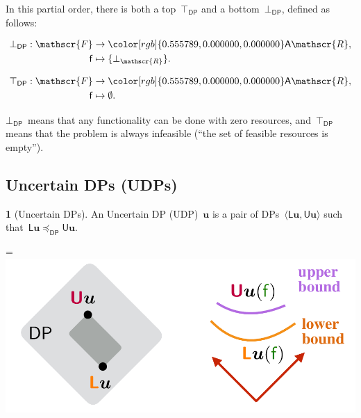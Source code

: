 \documentclass[twocolumn,english]{IEEEconf}
\theoremstyle{plain}
\theoremstyle{definition}
\theoremstyle{definition}
\newtheorem{defn}[thm]{\protect\definitionname}
\theoremstyle{plain}
\newcommand{\aword}[1]{\mathsf{#1}}
\newcommand{\vmath}[1]{\aword{#1}}
\newcommand{\posleq}{\preceq}
\newcommand{\antichains}{\vmath{A}}
\newcommand{\funsp}{\mathscr{F}}
\newcommand{\fun}{\vmath{f}}
\newcommand{\ressp}{\mathscr{R}}
\newcommand{\Aressp}{{\antichains\ressp}}
\newcommand{\udpL}{\boldsymbol{\mathsf{L}}}
\newcommand{\udpU}{\boldsymbol{\mathsf{U}}}
\newcommand{\dpsp}{\vmath{DP}}
\newcommand{\dpleq}{\posleq_\dpsp}
\newcommand{\colR}{\color[rgb]{0.555789,0.000000,0.000000}}
\newcommand*{\vcenteredhbox}[1]{\begingroup
\setbox0=\hbox{#1}\parbox{\wd0}{\box0}\endgroup}
\newcommand{\captionsideleft}[2]{
    \medskip
    \begin{minipage}{1.8cm}{
        \hfill
        \protect\captionof{figure}{#1}}\end{minipage}
    \begin{minipage}{6.6cm}
    
    \vcenteredhbox{{#2}}
    \hfill
    \end{minipage}
    \medskip
}
\renewcommand{\Aressp}{{\colR\antichains\ressp}}
\providecommand{\definitionname}{Definition}
\begin{document}
In this partial order, there is both a top~$\top_{\dpsp}$ and a
bottom~$\bot_{\dpsp}$, defined as follows:

\vspace{-5mm}

\begin{minipage}[t]{0.4\columnwidth}
\begin{align*}
\bot_{\dpsp}:\funsp & \rightarrow\Aressp,\\
\fun & \mapsto\{\bot_{\ressp}\}.
\end{align*}

\end{minipage}
\begin{minipage}[t]{0.4\columnwidth}
\begin{align}
\top_{\dpsp}:\funsp & \rightarrow\Aressp,\nonumber \\
\fun & \mapsto\emptyset.\label{eq:top}
\end{align}

\end{minipage}

\smallskip{}

$\bot_{\dpsp}$~means that any functionality can be done with zero
resources, and~$\top_{\dpsp}$ means that the problem is always infeasible
(``the set of feasible resources is empty'').

\subsection{Uncertain DPs (UDPs)}
\begin{defn}[Uncertain DPs]
An Uncertain DP (UDP)~$\boldsymbol{u}$ is a pair of DPs~$\langle\udpL\boldsymbol{u},\udpU\boldsymbol{u}\rangle$
such that~$\udpL\boldsymbol{u}\dpleq\udpU\boldsymbol{u}$.
\end{defn}
\captionsideleft{}{\includegraphics[scale=0.33]{unc_udpdef}}
\end{document}
